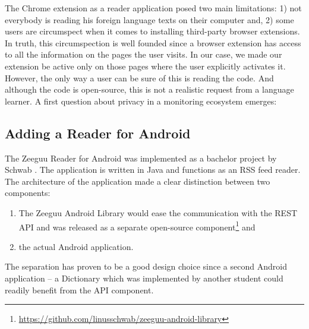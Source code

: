 

The Chrome extension as a reader application posed two main limitations: 
	1) not everybody is reading his foreign language texts on their computer and,
	2) some users are circumspect when it comes to installing third-party browser extensions. 
In truth, this circumspection is well founded since a browser extension has access to all the information on the pages the user visits. In our case, we made our extension be active only on those pages where the user explicitly activates it. However, the only way a user can be sure of this is reading the code. And although the code is open-source, this is not a realistic request from a language learner. A first question about privacy in a monitoring ecosystem emerges: 



\subsection {Adding a Reader for Android}

The Zeeguu Reader for Android was implemented as a bachelor project by Schwab \cite{Schw16thesis}. The application is written in Java and functions as an RSS feed reader. The architecture of the application made a clear distinction between two components: 

\begin{enumerate}
	\item The Zeeguu Android Library would ease the communication with the REST API and was released as a separate open-source component\footnote{\url{https://github.com/linusschwab/zeeguu-android-library}} and 
	\item the actual Android  application. 
\end{enumerate}

The separation has proven to be a good design choice since a second Android application -- a Dictionary \cite{Gieh15a} which was implemented by another student could readily benefit from the API component.

